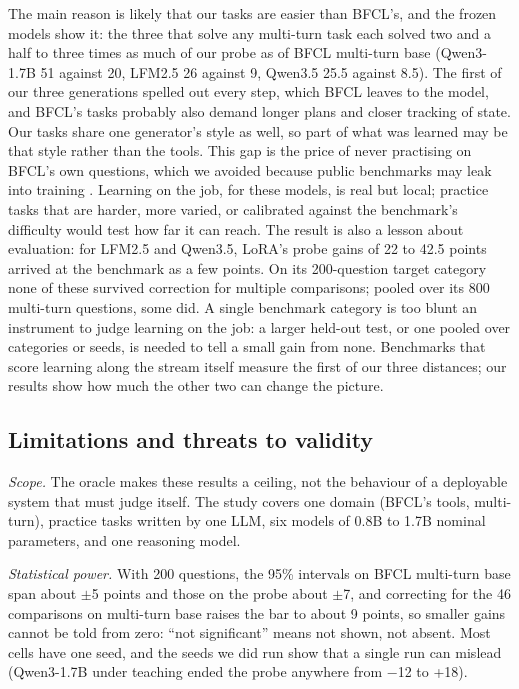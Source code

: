 \documentclass[a4paper,fleqn]{cas-dc}
\begin{document}
The main reason is likely that our tasks are easier than BFCL's, and the frozen models show it: the three that solve any
multi-turn task each solved two and a half to three times as much of our probe as of BFCL multi-turn base (Qwen3-1.7B 51
against 20, LFM2.5 26 against 9, Qwen3.5 25.5 against 8.5). The first of our three generations spelled out every step,
which BFCL leaves to the model, and BFCL's tasks probably also demand longer plans and closer tracking of state. Our tasks
share one generator's style as well, so part of what was learned may be that style rather than the tools. This gap is
the price of never practising on BFCL's own questions, which we avoided because public benchmarks may leak into
training \citep{golchin2024time}. Learning on the
job, for these models, is real but local; practice tasks that are harder, more varied, or calibrated against the
benchmark's difficulty would test how far it can reach. The result is also a lesson about evaluation: for LFM2.5 and Qwen3.5, LoRA's probe
gains of 22 to 42.5 points arrived at the benchmark as a few points. On its 200-question target category none of these
survived correction for multiple comparisons; pooled over its 800 multi-turn questions, some did. A single benchmark
category is too blunt an instrument to judge learning on the job: a larger held-out test, or one pooled over categories
or seeds, is needed to tell a small gain from none. Benchmarks that score learning along the stream itself
\citep{wu2024streambench,wei2025evomemory} measure the first of our three distances; our results show how much the
other two can change the picture.

\subsection{Limitations and threats to validity}\label{sec:limits}
\emph{Scope.} The oracle makes these results a ceiling, not the behaviour of a deployable system that must judge
itself. The study covers one domain (BFCL's tools, multi-turn), practice tasks written by one LLM, six models of 0.8B to
1.7B nominal parameters, and one reasoning model.

\emph{Statistical power.} With 200 questions, the 95\% intervals on BFCL multi-turn base span about $\pm$5 points and
those on the probe about $\pm$7, and correcting for the 46 comparisons on multi-turn base raises the bar to about 9
points, so smaller gains cannot be told from zero: ``not significant'' means not shown, not
absent. Most cells have one seed, and the seeds we did run show that a single run can mislead (Qwen3-1.7B under
teaching ended the probe anywhere from $-$12 to +18).
\end{document}
